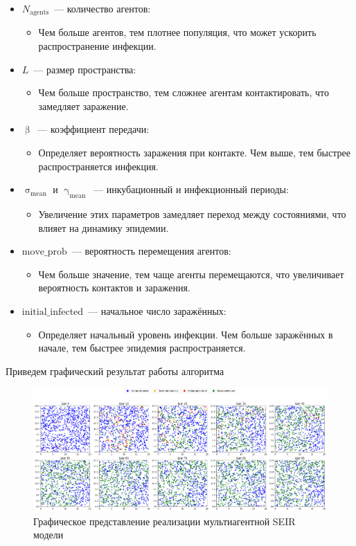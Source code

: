 \documentclass[a4paper, 14pt]{extreport}
\numberwithin{equation}{section}
\renewcommand{\beta}{\upbeta}
\renewcommand{\gamma}{\upgamma}
\renewcommand{\sigma}{\upsigma}
\begin{document}
	\begin{itemize}
		\item {$N_{\text{agents}}$}~--- количество агентов:
		\begin{itemize}
			\item Чем больше агентов, тем плотнее популяция, что может ускорить распространение инфекции.
		\end{itemize}
		\item \textbf{$L$}~--- размер пространства:
		\begin{itemize}
			\item Чем больше пространство, тем сложнее агентам контактировать, что замедляет заражение.
		\end{itemize}
		\item \textbf{$\beta$}~--- коэффициент передачи:
		\begin{itemize}
			\item Определяет вероятность заражения при контакте. Чем выше, тем быстрее распространяется инфекция.
		\end{itemize}
		\item {$\sigma_{\text{mean}}$ и $\gamma_{\text{mean}}$}~--- инкубационный и инфекционный периоды:
		\begin{itemize}
			\item Увеличение этих параметров замедляет переход между состояниями, что влияет на динамику эпидемии.
		\end{itemize}
		\item {$\text{move\_prob}$}~--- вероятность перемещения агентов:
		\begin{itemize}
			\item Чем больше значение, тем чаще агенты перемещаются, что увеличивает вероятность контактов и заражения.
		\end{itemize}
		\item {$\text{initial\_infected}$}~--- начальное число заражённых:
		\begin{itemize}
			\item Определяет начальный уровень инфекции. Чем больше заражённых в начале, тем быстрее эпидемия распространяется.
		\end{itemize}
	\end{itemize}
	
	Приведем графический результат работы алгоритма
	
	\begin{figure}[h]
		\centering
		\includegraphics[scale=0.3]{images/graph04}
		\caption{Графическое представление реализации мультиагентной SEIR модели}
		\label{fig:graph04}
	\end{figure}
	
\end{document}
